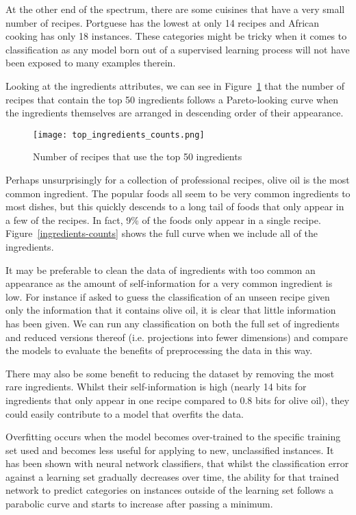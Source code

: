 \documentclass[11pt,a4paper]{article}
\begin{document}
At the other end of the spectrum, there are some cuisines that have a very small
number of recipes. Portguese has the lowest at only 14 recipes and African
cooking has only 18 instances. These categories might be tricky when it comes to
classification as any model born out of a supervised learning process will not
have been exposed to many examples therein.

Looking at the ingredients attributes, we can see in Figure~\ref{top-ingredients}
that the number of recipes that contain the top 50 ingredients follows a
Pareto-looking curve when the ingredients themselves are arranged in descending
order of their appearance.

\begin{figure}[p]
  \texttt{[image: top\_ingredients\_counts.png]}
  \caption{Number of recipes that use the top 50 ingredients\label{top-ingredients}}
\end{figure}

Perhaps unsurprisingly for a collection of professional recipes, olive oil is the most
common ingredient. The popular foods all seem to be very common ingredients to most
dishes, but this quickly descends to a long tail of foods that only appear in a few
of the recipes. In fact, 9\% of the foods only appear in a single recipe.
Figure~\ref{ingredients-counts} shows the full curve when we include all of the
ingredients.

It may be preferable to clean the data of ingredients
with too common an appearance as the amount of
self-information\cite{reza1961introduction} for a very common ingredient is low. For
instance if asked to guess the classification of an unseen recipe given only
the information that it contains olive oil, it is clear that little information
has been given. We can run any classification on both the full set of ingredients
and reduced versions thereof (i.e. projections into fewer dimensions) and compare
the models to evaluate the benefits of preprocessing the data in this way.

There may also be some benefit to reducing the dataset by removing the most rare
ingredients. Whilst their self-information is high (nearly 14 bits for ingredients
that only appear in one recipe compared to 0.8 bits for olive oil), they could
easily contribute to a model that overfits the data.

Overfitting occurs when the model becomes over-trained to the specific training set
used and becomes less useful for applying to new, unclassified instances. It has
been shown\cite{tetko1995neural} with neural network classifiers, that whilst the
classification error against a learning set gradually decreases over time, the
ability for that trained network to predict categories on instances outside of the
learning set follows a parabolic curve and starts to increase after passing a
minimum.
\end{document}
